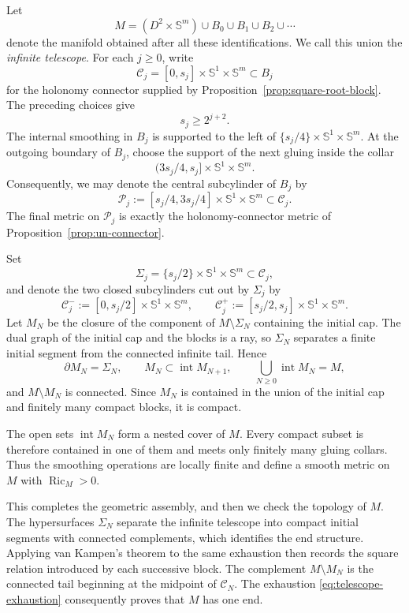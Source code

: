 \documentclass[11pt,reqno]{amsart}
\theoremstyle{definition}
\numberwithin{equation}{section}
\DeclareMathOperator{\Ric}{Ric}
\begin{document}
Let
\begin{equation}\label{def:telescope}
 M=(D^2\times\mathbb S^m)\cup B_0\cup B_1\cup B_2\cup\cdots
\end{equation}
denote the manifold obtained after all these identifications.  We call
this union the \emph{infinite telescope}.  For each
\(j\ge0\), write
\[
 \mathcal C_j=[0,s_j]\times\mathbb S^1\times\mathbb S^m
 \subset B_j
\]
for the holonomy connector supplied by
Proposition~\ref{prop:square-root-block}.  The preceding choices give
\[
 s_j\ge2^{j+2}.
\]
The internal smoothing in \(B_j\) is supported to the left of
\(\{s_j/4\}\times\mathbb S^1\times\mathbb S^m\).  At the outgoing
boundary of \(B_j\), choose the support of the next gluing inside the
collar
\[
 (3s_j/4,s_j]\times\mathbb S^1\times\mathbb S^m.
\]
Consequently, we may denote the central subcylinder of $B_j$ by
\begin{equation}\label{eq:un-central-slab}
 \mathcal P_j
 :=[s_j/4,3s_j/4]\times\mathbb S^1\times\mathbb S^m
 \subset\mathcal C_j.
\end{equation}
The final metric on $\mathcal P_j$ is exactly the holonomy-connector
metric of Proposition~\ref{prop:un-connector}.

Set
\[
 \Sigma_j=\{s_j/2\}\times\mathbb S^1\times\mathbb S^m
 \subset\mathcal C_j,
\]
and denote the two closed subcylinders cut out by $\Sigma_j$ by
\[
 \mathcal C_j^-
 :=[0,s_j/2]\times\mathbb S^1\times\mathbb S^m,
 \qquad
\mathcal C_j^+
 :=[s_j/2,s_j]\times\mathbb S^1\times\mathbb S^m.
\]
Let \(M_N\) be the closure of the component of
\(M\setminus\Sigma_N\) containing the initial cap.  The dual graph of the
initial cap and the blocks is a ray, so \(\Sigma_N\) separates a finite initial
segment from the connected infinite tail.  Hence
\begin{equation}\label{eq:telescope-exhaustion}
 \partial M_N=\Sigma_N,\qquad
 M_N\subset\operatorname{int}M_{N+1},\qquad
 \bigcup_{N\ge0}\operatorname{int}M_N=M,
\end{equation}
and \(M\setminus M_N\) is connected.  Since \(M_N\) is contained in the
union of the initial cap and finitely many compact blocks, it is compact.

The open sets \(\operatorname{int}M_N\) form a nested cover of \(M\).
Every compact subset is therefore contained in one of them and meets
only finitely many gluing collars.  Thus the smoothing operations are
locally finite and define a smooth metric on \(M\) with
\(\Ric_M>0\).

This completes the geometric assembly, and then we check the topology
of \(M\).  The hypersurfaces \(\Sigma_N\) separate the infinite
telescope into compact initial segments with connected complements,
which identifies the end structure.  Applying van Kampen's theorem to
the same exhaustion then records the square relation introduced by each
successive block.
The complement \(M\setminus M_N\) is the connected tail beginning at
the midpoint of \(\mathcal C_N\).  The exhaustion
\eqref{eq:telescope-exhaustion} consequently proves that \(M\) has one
end.
\end{document}
